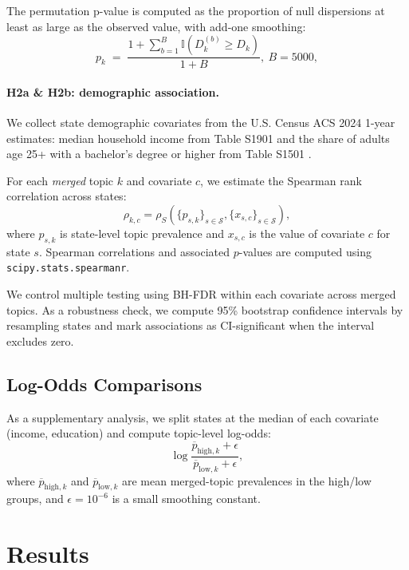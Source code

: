 \documentclass[11pt]{article}
\begin{document}
The permutation p-value is computed as the proportion of null dispersions at least as large as the observed value, with add-one smoothing:
\begin{equation}
p_k \;=\; \frac{1 + \sum_{b=1}^{B}\mathbb{I}\!\left(D_k^{(b)} \ge D_k\right)}{1+B},~B=5000,
\label{eq:perm_pvalue}
\end{equation}


\paragraph{H2a \& H2b: demographic association.}
We collect state demographic covariates from the U.S. Census ACS 2024 1-year estimates: median household income from Table S1901 \cite{uscensus_acs2024_s1901} and the share of adults age 25+ with a bachelor's degree or higher from Table S1501 \cite{uscensus_acs2024_s1501}.

For each \emph{merged} topic $k$ and covariate $c$, we estimate the Spearman rank correlation \citep{spearman1961proof} across states:
\begin{equation}
\rho_{k,c}=\rho_S\!\left(\{p_{s,k}\}_{s\in\mathcal S},\{x_{s,c}\}_{s\in\mathcal S}\right),
\end{equation}
where $p_{s,k}$ is state-level topic prevalence and $x_{s,c}$ is the value of covariate $c$ for state $s$. Spearman correlations and associated $p$-values are computed using \texttt{scipy.stats.spearmanr}.

We control multiple testing using BH-FDR within each covariate across merged topics. As a robustness check, we compute 95\% bootstrap confidence intervals by resampling states and mark associations as CI-significant when the interval excludes zero.



\subsection{Log-Odds Comparisons}

As a supplementary analysis, we split states at the median of each covariate (income, education) and compute topic-level log-odds:
\[
\log\frac{\overline{p}_{\text{high},k}+\epsilon}{\overline{p}_{\text{low},k}+\epsilon},
\]
where $\overline{p}_{\text{high},k}$ and $\overline{p}_{\text{low},k}$ are mean merged-topic prevalences in the high/low groups, and $\epsilon=10^{-6}$ is a small smoothing constant.


\section{Results}
\label{sec:results}
\end{document}
